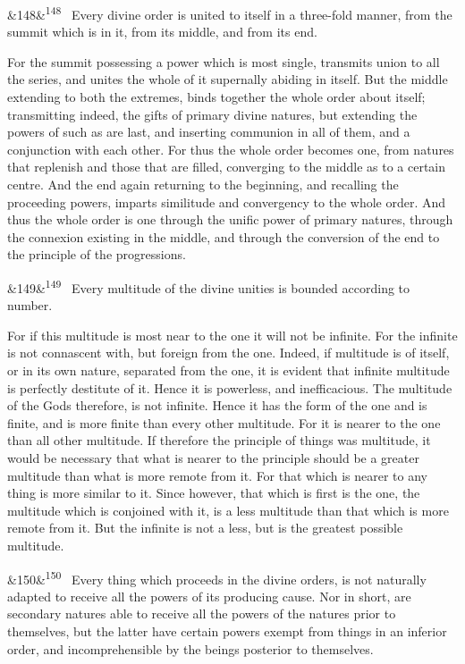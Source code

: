 \documentclass[12pt]{article}
\newcommand{\para}[1][]{\par\noindent\ifx&#1&\else\textsuperscript{\footnotesize #1}~\fi}
\begin{document}
\para[148] Every divine order is united to itself in a three-fold manner, from the summit which is in it, from its middle, and from its end.

For the summit possessing a power which is most single, transmits union to all the series, and unites the whole of it supernally abiding in itself. But the middle extending to both the extremes, binds together the whole order about itself; transmitting indeed, the gifts of primary divine natures, but extending the powers of such as are last, and inserting communion in all of them, and a conjunction with each other. For thus the whole order becomes one, from natures that replenish and those that are filled, converging to the middle as to a certain centre. And the end again returning to the beginning, and recalling the proceeding powers, imparts similitude and convergency to the whole order. And thus the whole order is one through the unific power of primary natures, through the connexion existing in the middle, and through the conversion of the end to the principle of the progressions.

\para[149] Every multitude of the divine unities is bounded according to number.

For if this multitude is most near to the one it will not be infinite. For the infinite is not connascent with, but foreign from the one. Indeed, if multitude is of itself, or in its own nature, separated from the one, it is evident that infinite multitude is perfectly destitute of it. Hence it is powerless, and inefficacious. The multitude of the Gods therefore, is not infinite. Hence it has the form of the one and is finite, and is more finite than every other multitude. For it is nearer to the one than all other multitude. If therefore the principle of things was multitude, it would be necessary that what is nearer to the principle should be a greater multitude than what is more remote from it. For that which is nearer to any thing is more similar to it. Since however, that which is first is the one, the multitude which is conjoined with it, is a less multitude than that which is more remote from it. But the infinite is not a less, but is the greatest possible multitude.

\para[150] Every thing which proceeds in the divine orders, is not naturally adapted to receive all the powers of its producing cause. Nor in short, are secondary natures able to receive all the powers of the natures prior to themselves, but the latter have certain powers exempt from things in an inferior order, and incomprehensible by the beings posterior to themselves.
\end{document}
